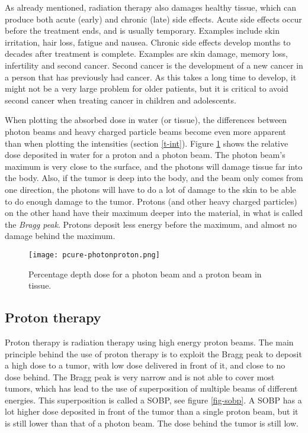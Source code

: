 \documentclass[../main/thesis.tex]{subfiles}
\begin{document}
As already mentioned, radiation therapy also damages healthy tissue, which can produce both acute (early) and chronic (late) side effects. Acute side effects occur before the treatment ends, and is usually temporary. Examples include skin irritation, hair loss, fatigue and nausea. Chronic side effects develop months to decades after treatment is complete. Examples are skin damage, memory loss, infertility and second cancer. Second cancer is the development of a new cancer in a person that has previously had cancer. As this takes a long time to develop, it might not be a very large problem for older patients, but it is critical to avoid second cancer when treating cancer in children and adolescents. \citep{nih} 

When plotting the absorbed dose in water (or tissue), the differences between photon beams and heavy charged particle beams become even more apparent than when plotting the intensities (section \ref{t-int}). Figure \ref{fig-photonproton} shows the relative dose deposited in water for a proton and a photon beam. The photon beam's maximum is very close to the surface, and the photons will damage tissue far into the body. Also, if the tumor is deep into the body, and the beam only comes from one direction, the photons will have to do a lot of damage to the skin to be able to do enough damage to the tumor. Protons (and other heavy charged particles) on the other hand have their maximum deeper into the material, in what is called the \textit{Bragg peak}. Protons deposit less energy before the maximum, and almost no damage behind the maximum. 

\begin{figure}%
	\centering
	\texttt{[image: pcure-photonproton.png]}
	\caption{Percentage depth dose for a photon beam and a proton beam in tissue. \citetext{\citeauthor{pcure}}}
	\label{fig-photonproton}
\end{figure}


\subsection{Proton therapy}
\label{t-proton}
Proton therapy is radiation therapy using high energy proton beams. The main principle behind the use of proton therapy is to exploit the Bragg peak to deposit a high dose to a tumor, with low dose delivered in front of it, and close to no dose behind. The Bragg peak is very narrow and is not able to cover most tumors, which has lead to the use of superposition of multiple beams of different energies. This superposition is called a \gls{SOBP}, see figure \ref{fig-sobp}. A \gls{SOBP} has a lot higher dose deposited in front of the tumor than a single proton beam, but it is still lower than that of a photon beam. The dose behind the tumor is still low. \citep[chap. 27]{Khan}
\end{document}
